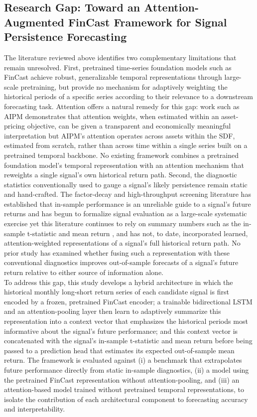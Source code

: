 \documentclass[pdflatex,sn-mathphys-num]{sn-jnl}%
\theoremstyle{thmstyleone}%
\theoremstyle{thmstyletwo}%
\theoremstyle{thmstylethree}%
\begin{document}
\subsection{Research Gap: Toward an Attention-Augmented FinCast Framework for Signal Persistence Forecasting}

The literature reviewed above identifies two complementary limitations that remain unresolved. First, pretrained time-series foundation models such as FinCast achieve robust, generalizable temporal representations through large-scale pretraining, but provide no mechanism for adaptively weighting the historical periods of a specific series according to their relevance to a downstream forecasting task. Attention offers a natural remedy for this gap: work such as AIPM demonstrates that attention weights, when estimated within an asset-pricing objective, can be given a transparent and economically meaningful interpretation but AIPM's attention operates across assets within the SDF, estimated from scratch, rather than across time within a single series built on a pretrained temporal backbone. No existing framework combines a pretrained foundation model's temporal representation with an attention mechanism that reweights a single signal's own historical return path. Second, the diagnostic statistics conventionally used to gauge a signal's likely persistence remain static and hand-crafted. The factor-decay and high-throughput screening literature has established that in-sample performance is an unreliable guide to a signal's future returns \cite{mclean2016does, chen2023zeroing, bowles2024anomaly} and has begun to formalize signal evaluation as a large-scale systematic exercise \cite{chen2025highthroughputassetpricing} yet this literature continues to rely on summary numbers such as the in-sample t-statistic and mean return \cite{harvey2016and}, and has not, to date, incorporated learned, attention-weighted representations of a signal's full historical return path. No prior study has examined whether fusing such a representation with these conventional diagnostics improves out-of-sample forecasts of a signal's future return relative to either source of information alone.\\

To address this gap, this study develops a hybrid architecture in which the historical monthly long-short return series of each candidate signal is first encoded by a frozen, pretrained FinCast encoder; a trainable bidirectional LSTM and an attention-pooling layer then learn to adaptively summarize this representation into a context vector that emphasizes the historical periods most informative about the signal's future performance; and this context vector is concatenated with the signal's in-sample t-statistic and mean return before being passed to a prediction head that estimates its expected out-of-sample mean return. The framework is evaluated against (i) a benchmark that extrapolates future performance directly from static in-sample diagnostics, (ii) a model using the pretrained FinCast representation without attention-pooling, and (iii) an attention-based model trained without pretrained temporal representations, to isolate the contribution of each architectural component to forecasting accuracy and interpretability.
\end{document}
